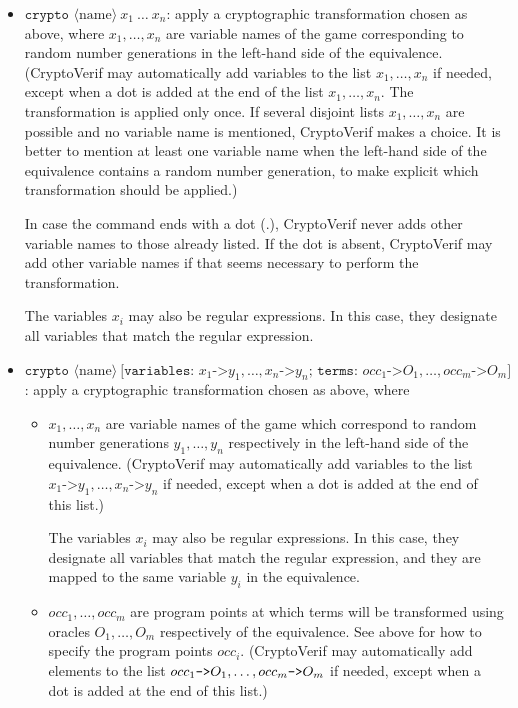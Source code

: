 \documentclass{article}
\newcommand{\nonterm}[1]{\langle\textrm{#1}\rangle}
\begin{document}
\begin{itemize}
\begin{itemize}
\item $\texttt{crypto }\nonterm{name}\ x_1\ \ldots\ x_n$: apply a cryptographic
transformation chosen as above, where $x_1, \ldots, x_n$ are variable
names of the game corresponding to random number generations 
in the left-hand side of the
equivalence. (CryptoVerif may automatically add variables to the list
$x_1, \ldots, x_n$ if needed, except when a dot is added at the end of
the list $x_1, \ldots, x_n$. The transformation is applied only once.
If several disjoint lists $x_1, \ldots, x_n$ are possible and no variable
name is mentioned, CryptoVerif makes a choice. It is better to mention
at least one variable name when the left-hand side of the equivalence
contains a random number generation, to make explicit which transformation 
should be applied.)

In case the command ends with a dot ($\texttt{.}$), CryptoVerif never adds 
other variable names to those already listed. If the dot is absent,
CryptoVerif may add other variable names if that seems necessary to perform
the transformation.

The variables $x_i$ may also be regular expressions.
In this case, they designate all variables that match the regular expression.

\item $\texttt{crypto }\nonterm{name}\ 
\texttt{[variables: }x_1\texttt{->}y_1,\ldots, x_n\texttt{->}y_n
\texttt{; terms: }occ_1\texttt{->}O_1,\ldots,occ_m\texttt{->}O_m\texttt{]}$:
apply a cryptographic transformation chosen as above, where
\begin{itemize}

\item $x_1, \ldots, x_n$ are variable names of the game which
  correspond to random number generations $y_1, \ldots, y_n$
  respectively in the left-hand side of the equivalence. (CryptoVerif
  may automatically add variables to the list
  $x_1\texttt{->}y_1,\ldots, x_n\texttt{->}y_n$ if needed, except when
  a dot is added at the end of this list.)

The variables $x_i$ may also be regular expressions.
In this case, they designate all variables that match the regular expression,
and they are mapped to the same variable $y_i$ in the equivalence.

\item $occ_1, \ldots, occ_m$ are program points at which terms 
  will be transformed using oracles $O_1, \ldots, O_m$ respectively of
  the equivalence. See above for how to specify the program points $occ_i$. 
  (CryptoVerif may automatically add elements to the
  list $occ_1\texttt{->}O_1,\ldots,\allowbreak occ_m\texttt{->}O_m$ if needed, except
  when a dot is added at the end of this list.)


\end{itemize}
\end{itemize}
\end{itemize}
\end{document}
